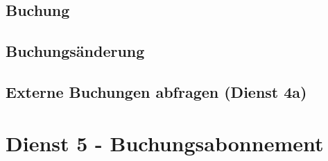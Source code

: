 \subsection*{Buchung}
\label{subsec:Nachrichten:Dienst4:Booking}



\medskip




\subsection*{Buchungsänderung}
\label{subsec:Nachrichten:Dienst4:ChangeBooking}





\subsection*{Externe Buchungen abfragen (Dienst 4a)}
\label{subsec:Nachrichten:Dienst4:externalBookingRequestType}





% 

% 








\section{Dienst 5 - Buchungsabonnement}
\label{sec:Nachrichten:Dienst5}

